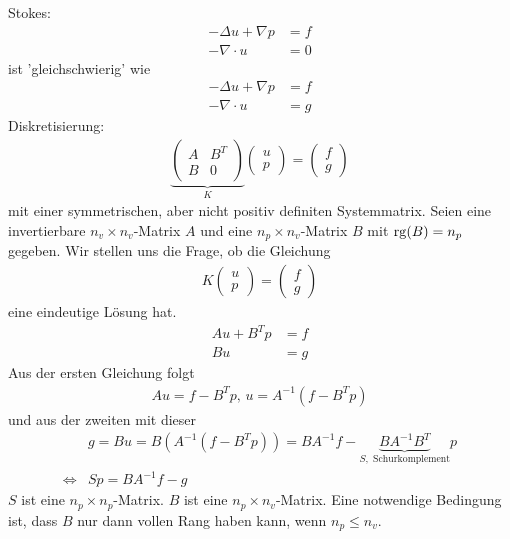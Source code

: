 Stokes:
\begin{align*}
  - \Delta u + \nabla p &= f \\
  - \nabla \cdot u &= 0
\end{align*}
ist 'gleichschwierig' wie
\begin{align*}
  - \Delta u + \nabla p &= f \\
  - \nabla \cdot u &= g
\end{align*}
Diskretisierung:
\begin{align*}\underbrace{
  \begin{pmatrix}
  A &B^{T} \\ B & 0   
  \end{pmatrix}}_{K}
  \begin{pmatrix}
    u\\ p
  \end{pmatrix}
=
\begin{pmatrix}
  f\\g
\end{pmatrix} 
\end{align*}
mit einer symmetrischen, aber nicht positiv definiten Systemmatrix. Seien eine invertierbare $n_{v} \times n_{v}$-Matrix $A$ und eine $n_{p} \times n_{v}$-Matrix $B$ mit $\operatorname{rg} (B) = n_{p}$ gegeben. Wir stellen uns die Frage, ob die Gleichung
\begin{align*}
  K  \begin{pmatrix}
    u\\ p
  \end{pmatrix}
=
\begin{pmatrix}
  f\\g
\end{pmatrix} 
\end{align*}
eine eindeutige Lösung hat.
\begin{align*}
  A u + B^{T}p &= f \\
Bu &= g
\end{align*}
Aus der ersten Gleichung folgt
\begin{align*}
  Au = f-B^{T}p, \, u= A^{-1}(f -B^{T}p)
\end{align*}
und aus der zweiten mit dieser
\begin{align*}
&  g = Bu = B(A^{-1}(f- B^{T}p)) = BA^{-1}f - \underbrace{BA^{-1}B^{T}}_{S, \text{ Schurkomplement}}p\\
\iff& Sp = BA^{-1}f-g
\end{align*}
$S$ ist eine $n_{p} \times n_{p}$-Matrix. $B$ ist eine $n_{p} \times n_{v}$-Matrix. Eine notwendige Bedingung ist, dass $B$ nur dann vollen Rang haben kann, wenn $n_{p}\leq n_{v}$.

